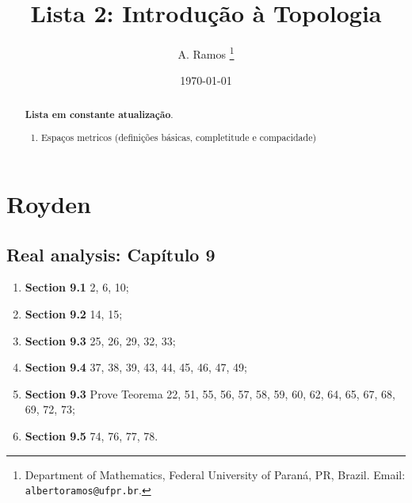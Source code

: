 \documentclass[latin,20pt]{article}
\begin{document}
\title{Lista 2: Introdução à Topologia }
 
\author{
A. Ramos \thanks{Department of Mathematics,
    Federal University of Paraná, PR, Brazil.
    Email: {\tt albertoramos@ufpr.br}.}
}

\date{\today}
 
\maketitle

\begin{abstract}
{\bf Lista em constante atualização}.
 \begin{enumerate}
 \item Espaços metricos (definições básicas, completitude e compacidade)
 \end{enumerate}
\end{abstract}

  
  \section*{Royden}
  \subsection*{Real analysis: Capítulo 9}
    \begin{enumerate}
    \item {\bf Section 9.1} 2, 6, 10;
    \item {\bf Section 9.2} 14, 15;
    \item {\bf Section 9.3} 25, 26, 29, 32, 33;
    \item {\bf Section 9.4} 37, 38, 39, 43, 44, 45, 46, 47, 49;
    \item {\bf Section 9.3} Prove Teorema 22, 51, 55, 56, 57, 58, 59, 60, 62, 64, 65, 67, 68, 69, 72, 73; 
    \item {\bf Section 9.5} 74, 76, 77, 78.
    \end{enumerate}
\end{document}
